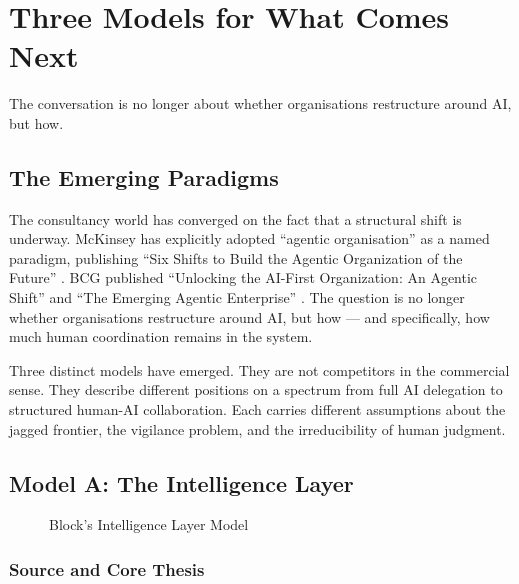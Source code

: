 \chapter{Three Models for What Comes Next}
\label{ch:three-models}

\epigraph{The conversation is no longer about whether organisations restructure around AI, but how.}{}

\section{The Emerging Paradigms}

The consultancy world has converged on the fact that a structural shift is underway. McKinsey has explicitly adopted ``agentic organisation'' as a named paradigm, publishing ``Six Shifts to Build the Agentic Organization of the Future'' \parencite{McKinseySixShifts2026}. BCG published ``Unlocking the AI-First Organization: An Agentic Shift'' \parencite{BCGAgenticShift2025} and ``The Emerging Agentic Enterprise'' \parencite{BCGAgenticEnterprise2025}. The question is no longer whether organisations restructure around AI, but how --- and specifically, how much human coordination remains in the system.

Three distinct models have emerged. They are not competitors in the commercial sense. They describe different positions on a spectrum from full AI delegation to structured human-AI collaboration. Each carries different assumptions about the jagged frontier, the vigilance problem, and the irreducibility of human judgment.

\section{Model A: The Intelligence Layer}

\begin{figure}[h]
\centering
{}
\caption{Block's Intelligence Layer Model}
\label{fig:intelligence-layer}
\end{figure}

\subsection{Source and Core Thesis}

